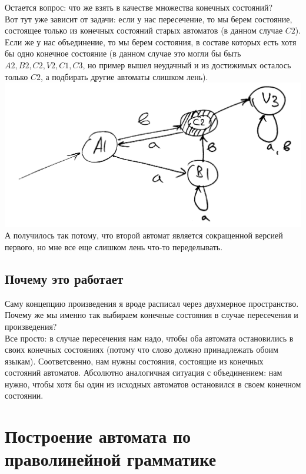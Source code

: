 \documentclass[14pt]{extreport}
\begin{document}
	Остается вопрос: что же взять в качестве множества конечных состояний?\\
	Вот тут уже зависит от задачи: если у нас пересечение, то мы берем состояние, состоящее
	только из конечных состояний старых автоматов (в данном случае $C2$).\\
	Если же у нас объединение, то мы берем состояния, в составе которых есть хотя бы одно
	конечное состояние (в данном случае это могли бы быть $A2, B2, C2, V2, C1, C3$, но
	пример вышел неудачный и из достижимых осталось только $C2$, а подбирать другие
	автоматы слишком лень).\\
	\includegraphics[scale=0.09]{data/pic5_7.png}\\
	А получилось так потому, что второй автомат является сокращенной версией
	первого, но мне все еще слишком лень что-то переделывать.\\
	\section{Почему это работает}
	Саму концепцию произведения я вроде расписал через двухмерное пространство. Почему же мы
	именно так выбираем конечные состояния в случае пересечения и произведения?\\
	Все просто: в случае пересечения нам надо, чтобы оба автомата остановились в своих конечных
	состояниях (потому что слово должно принадлежать обоим языкам). Соответсвенно, нам нужны
	состояния, состоящие из конечных состояний автоматов. Абсолютно аналогичная ситуация с
	объединением: нам нужно, чтобы хотя бы один из исходных автоматов остановился в своем
	конечном состоянии.
	
	\chapter{Построение автомата по праволинейной грамматике}
\end{document}
